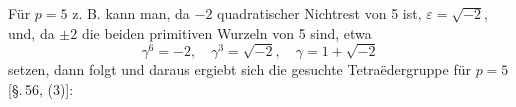 Für $p = 5$ z. B. kann man, da $-2$ quadratischer Nichtrest von 5 ist,
$\varepsilon = \sqrt{-2}$, und, da $\pm 2$ die beiden primitiven
Wurzeln von 5 sind, etwa
\[
\gamma^6 = -2, \quad \gamma^3 = \sqrt{-2}, \quad \gamma = 1 + \sqrt{-2}
\]
setzen, dann folgt
und daraus ergiebt sich die gesuchte Tetraëdergruppe für $p = 5$
[\S.\,56, (3)]:
